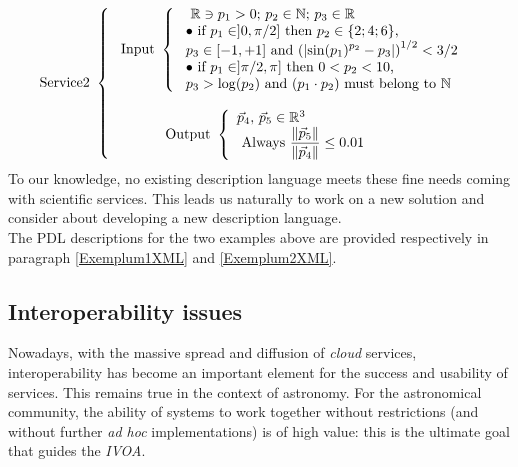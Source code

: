\documentclass[a4paper,11pt] {ivoa}
\begin{document}
\begin{equation}\label{PDLExemplum02}
\mbox{Service2 } \left\{
\begin{array}{l}
\ \mbox{Input } \left\{
\begin{array}{l}
\ \mbox{ $\mathbb R \ni p_1 >0$; $p_2 \in \mathbb N$; $p_3 \in \mathbb R$} \\
\  \bullet \mbox{ if $p_1 \in ]0,\pi/2]$ then $p_2 \in \{2;4;6\}$,}\\
\ \mbox{$p_3 \in [-1,+1]$ and $\displaystyle \left( \left|  \sin(p_1)^{p_2} -p_3 \right| \right)^{1/2}<3/2$ } \\
\ \bullet \mbox{ if $p_1 \in ]\pi/2,\pi]$ then $0<p_2 < 10$,}\\
\ \mbox{$p_3>\log(p_2)$ and $(p_1 \cdot p_2)$ must belong to $\mathbb N$} \\
\end{array}
\right. \\
\\
\ \mbox{\hspace{1cm} Output } \left\{
\begin{array}{l}
 \mbox{$\vec p_4, \, \vec p_5 \in \mathbb R^3$ } \\
 \ \mbox{Always $\displaystyle \frac{\| \vec p_5\|}{\|\vec p_4 \|} \leq 0.01 $} \\
 \end{array}
\right.\\
\end{array}
\right.
\end{equation}
To our knowledge, no existing description language meets these fine needs coming with scientific
services. This leads us naturally to work on a new solution and consider about developing a new
description language.\\

 The PDL descriptions for the two examples above are provided respectively in paragraph \ref{Exemplum1XML}
and \ref{Exemplum2XML}.

\subsection{Interoperability issues}\label{ParInteropIssues}
Nowadays, with the massive spread and diffusion of {\it cloud} services, interoperability has become
an important element for the success and usability of services. This remains true in the context of
astronomy.
For the astronomical community, the ability of systems to work together without restrictions (and
without further {\it ad hoc} implementations) is of high value: this is the ultimate goal
that guides the {\it IVOA}.\\
\end{document}

